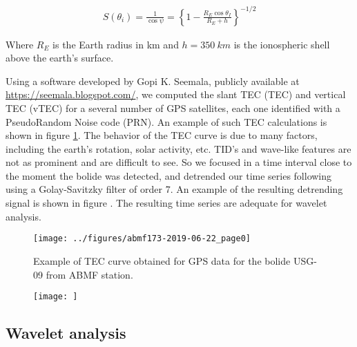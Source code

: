   \begin{align}
    S(\theta_i) = \frac{1}{\cos\psi} = \left\lbrace 1-\frac{R_E\cos\theta_I}{R_E+h}\right\rbrace^{-1/2}
  \end{align}

  Where $R_E$ is the Earth radius in km and $h=\SI{350}{km}$ is the ionospheric shell above the earth's surface.

 Using a software developed by Gopi K. Seemala, publicly available at \url{https://seemala.blogspot.com/}, we computed the slant TEC (TEC) and vertical TEC (vTEC) for a several number of GPS satellites, each one identified with a PseudoRandom Noise code (PRN). An example of such TEC calculations is shown in figure \ref{fig:TEC-curve-example}. The behavior of the TEC curve is due to many factors, including the earth's rotation, solar activity, etc. TID's and wave-like features are not as prominent and are difficult to see. So we focused in a time interval close to the moment the bolide was detected, and detrended our time series following \citet{Pradipta:2015} using a Golay-Savitzky filter of order 7. An example of the resulting detrending signal is shown in figure . The resulting time series are adequate for wavelet analysis.%

\begin{figure}
\texttt{[image: ../figures/abmf173-2019-06-22\_page0]}
\label{fig:TEC-curve-example}
\caption{Example of TEC curve obtained for GPS data for the bolide USG-09 from ABMF station.}
\end{figure}
 

\begin{figure}
\texttt{[image: ]}
\end{figure}
  
\subsection{Wavelet analysis}

  
     
